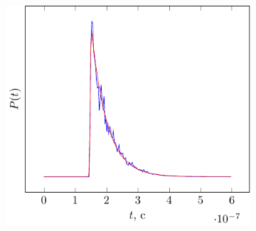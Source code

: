 \documentclass[10pt,pdf,hyperref={unicode}, dvipsnames]{beamer}
\begin{document}
\begin{frame}
\begin{figure}
\begin{subfigure}{0.42\linewidth}
    \end{subfigure}
    \begin{subfigure}{0.42\linewidth}
        \centering
        \includegraphics[width=1\linewidth,page=3]{fig/retracking/model}
    \end{subfigure}
\end{figure}
\end{frame}
\end{document}
